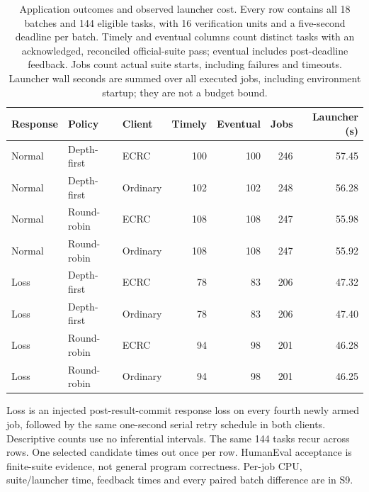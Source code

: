 \begin{table}[!htbp]
\centering
\small
\setlength{\tabcolsep}{4pt}
\renewcommand{\arraystretch}{1.12}
\caption{Application outcomes and observed launcher cost. Every row contains all 18 batches and 144 eligible tasks, with 16 verification units and a five-second deadline per batch. Timely and eventual columns count distinct tasks with an acknowledged, reconciled official-suite pass; eventual includes post-deadline feedback. Jobs count actual suite starts, including failures and timeouts. Launcher wall seconds are summed over all executed jobs, including environment startup; they are not a budget bound.}
\label{tab:application}
\begin{tabular}{@{}lllrrrr@{}}
\toprule
Response & Policy & Client & Timely & Eventual & Jobs & Launcher (s)\\
\midrule
Normal & Depth-first & ECRC & 100 & 100 & 246 & 57.45\\
Normal & Depth-first & Ordinary & 102 & 102 & 248 & 56.28\\
Normal & Round-robin & ECRC & 108 & 108 & 247 & 55.98\\
Normal & Round-robin & Ordinary & 108 & 108 & 247 & 55.92\\
\addlinespace
Loss & Depth-first & ECRC & 78 & 83 & 206 & 47.32\\
Loss & Depth-first & Ordinary & 78 & 83 & 206 & 47.40\\
Loss & Round-robin & ECRC & 94 & 98 & 201 & 46.28\\
Loss & Round-robin & Ordinary & 94 & 98 & 201 & 46.25\\
\bottomrule
\end{tabular}
\par\smallskip
\begin{minipage}{\linewidth}\small
Loss is an injected post-result-commit response loss on every fourth newly armed job, followed by the same one-second serial retry schedule in both clients. Descriptive counts use no inferential intervals. The same 144 tasks recur across rows. One selected candidate times out once per row. HumanEval acceptance is finite-suite evidence, not general program correctness. Per-job CPU, suite/launcher time, feedback times and every paired batch difference are in S9.
\end{minipage}
\end{table}
